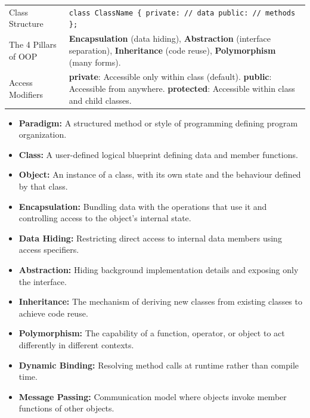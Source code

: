 \documentclass[12pt,a4paper]{article}
\renewcommand{\arraystretch}{1.45}
\begin{document}
\begin{tcolorbox}[formulabox, title={\textbf{Key Concepts at a Glance}}]
\renewcommand{\arraystretch}{1.3}
\begin{tabularx}{\linewidth}{B{3.2cm} X}
Class Structure         & \texttt{class ClassName \{ private: // data public: // methods \};} \\[4pt]
The 4 Pillars of OOP    & \textbf{Encapsulation} (data hiding), \textbf{Abstraction} (interface separation), \textbf{Inheritance} (code reuse), \textbf{Polymorphism} (many forms). \\[4pt]
Access Modifiers        & \textbf{private}: Accessible only within class (default). \newline \textbf{public}: Accessible from anywhere. \newline \textbf{protected}: Accessible within class and child classes.
\end{tabularx}
\end{tcolorbox}

\begin{tcolorbox}[defbox, title={\textbf{One-Line Definitions}}]
\begin{itemize}[leftmargin=*, itemsep=2.5pt, topsep=0pt]
  \item \textbf{Paradigm:} A structured method or style of programming defining program organization.
  \item \textbf{Class:} A user-defined logical blueprint defining data and member functions.
  \item \textbf{Object:} An instance of a class, with its own state and the behaviour defined by that class.
  \item \textbf{Encapsulation:} Bundling data with the operations that use it and controlling access to the object's internal state.
  \item \textbf{Data Hiding:} Restricting direct access to internal data members using access specifiers.
  \item \textbf{Abstraction:} Hiding background implementation details and exposing only the interface.
  \item \textbf{Inheritance:} The mechanism of deriving new classes from existing classes to achieve code reuse.
  \item \textbf{Polymorphism:} The capability of a function, operator, or object to act differently in different contexts.
  \item \textbf{Dynamic Binding:} Resolving method calls at runtime rather than compile time.
  \item \textbf{Message Passing:} Communication model where objects invoke member functions of other objects.
\end{itemize}
\end{tcolorbox}
\end{document}
